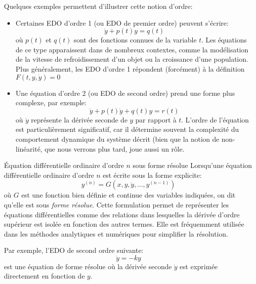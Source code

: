         Quelques exemples permettent d’illustrer cette notion d’ordre:
        \begin{itemize}
            \item Certaines EDO d'ordre 1 (ou EDO de premier ordre) peuvent s'écrire: 
            \begin{equation}
                \dot{y} + p(t)y=q(t)
            \end{equation}
            où $p(t)$ et $q(t)$ sont des fonctions connues de la variable $t$. Les équations de ce type apparaissent dans de nombreux contextes, comme la modélisation de la vitesse de refroidissement d'un objet ou la croissance d'une population. Plus généralement, les EDO d'ordre 1 répondent (forcément) à la définition $F(t, y, \dot{y})=0$
            
            \item Une équation d'ordre 2 (ou EDO de second ordre) prend une forme plus complexe, par exemple:
            \begin{equation}
                \ddot{y} + p(t)\dot{y} + q(t)y=r(t)
            \end{equation}
            où $\ddot{y}$ représente la dérivée seconde de $y$ par rapport à $t$. L'ordre de l'équation est particulièrement significatif, car il détermine souvent la complexité du comportement dynamique du système décrit (bien que la notion de non-linéarité, que nous verrons plus tard, joue aussi un rôle.
        \end{itemize}
        
        \begin{definition}{Équation différentielle ordinaire d'ordre $n$ sous forme résolue}\label{def:resolved_form}
            Lorsqu'une équation différentielle ordinaire d'ordre $n$ est écrite sous la forme explicite:
            \begin{equation}
                y^{(n)}=G(x, y, \dot{y}, \ldots, y^{(n-1)})
            \end{equation}
            où $G$ est une fonction bien définie et continue des variables indiquées, on dit qu'elle est sous \textit{forme résolue}. Cette formulation permet de représenter les équations différentielles comme des relations dans lesquelles la dérivée d'ordre supérieur est isolée en fonction des autres termes. Elle est fréquemment utilisée dans les méthodes analytiques et numériques pour simplifier la résolution.
        \end{definition}
        
        Par exemple, l'EDO de second ordre suivante:
        \begin{equation}
            \ddot{y}=-k y
        \end{equation}
        est une équation de forme résolue où la dérivée seconde $\ddot{y}$ est exprimée directement en fonction de $y$. 
        
